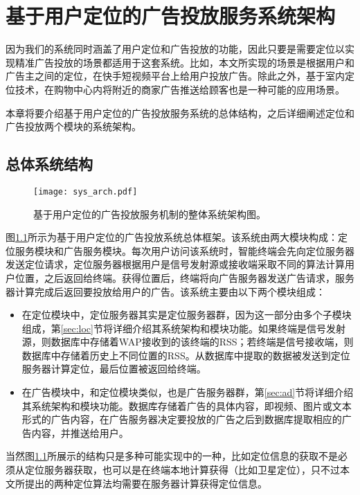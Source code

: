 \chapter{基于用户定位的广告投放服务系统架构}
\label{cha:sys_arch}

因为我们的系统同时涵盖了用户定位和广告投放的功能，因此只要是需要定位以实现精准广告投放的场景都适用于这套系统。比如，本文所实现的场景是根据用户和广告主之间的定位，在快手短视频平台上给用户投放广告。除此之外，基于室内定位技术，在购物中心内将附近的商家广告推送给顾客也是一种可能的应用场景。

本章将要介绍基于用户定位的广告投放服务系统的总体结构，之后详细阐述定位和广告投放两个模块的系统架构。

\section{总体系统结构}

\begin{figure}[htb]
	\centering
	\texttt{[image: sys\_arch.pdf]}
	\caption{基于用户定位的广告投放服务机制的整体系统架构图。}
	\label{fig:sysarch}
\end{figure}

图\ref{fig:sysarch}所示为基于用户定位的广告投放系统总体框架。该系统由两大模块构成：定位服务模块和广告服务模块。每次用户访问该系统时，智能终端会先向定位服务器发送定位请求，定位服务器根据用户是信号发射源或接收端采取不同的算法计算用户位置，之后返回给终端。获得位置后，终端将向广告服务器发送广告请求，服务器计算完成后返回要投放给用户的广告。该系统主要由以下两个模块组成：
\begin{itemize}
	\item 在定位模块中，定位服务器其实是定位服务器群，因为这一部分由多个子模块组成，第\ref{sec:loc}节将详细介绍其系统架构和模块功能。如果终端是信号发射源，则数据库中存储着WAP接收到的该终端的RSS；若终端是信号接收端，则数据库中存储着历史上不同位置的RSS。从数据库中提取的数据被发送到定位服务器计算定位，最后位置被返回给终端。
	\item 在广告模块中，和定位模块类似，也是广告服务器群，第\ref{sec:ad}节将详细介绍其系统架构和模块功能。数据库存储着广告的具体内容，即视频、图片或文本形式的广告内容，在广告服务器决定要投放的广告之后到数据库提取相应的广告内容，并推送给用户。
\end{itemize}

当然图\ref{fig:sysarch}所展示的结构只是多种可能实现中的一种，比如定位信息的获取不是必须从定位服务器获取，也可以是在终端本地计算获得（比如卫星定位），只不过本文所提出的两种定位算法均需要在服务器计算获得定位信息。

